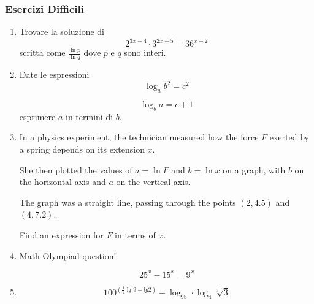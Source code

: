 \subsubsection{Esercizi Difficili}\label{subsec:eser_diff} %

\begin{enumerate} %
\item Trovare la soluzione di %
\begin{equation*}
2^{3x-4}\cdot3^{2x-5}=36^{x-2}
\end{equation*}
scritta come $\frac{\ln p}{\ln q}$ dove $p$ e $q$ sono interi.
\item Date le espressioni %
\begin{equation*}
\log_a b^2=c^2
\end{equation*}

\begin{equation*}
\log_b a = c+1
\end{equation*}
esprimere $a$ in termini di $b$.
\item  %
In a physics experiment, the technician measured how the force $F$ exerted by a spring depends on its extension $x$.

She then plotted the values of $a = \ln F$ and $b = \ln x$ on a graph, with $b$ on the horizontal axis and $a$ on the vertical axis.

The graph was a straight line, passing through the points $(2, 4.5)$ and $(4, 7.2)$.

Find an expression for $F$ in terms of $x$.

\item Math Olympiad question!  

\begin{equation*}
25^x-15^x=9^x
\end{equation*}


\item 

\begin{equation*}
100^{\left(\frac{1}{2}\lg9-lg2\right)}-\log_98\cdot\log_4\sqrt[3]{3}
\end{equation*}



\end{enumerate} %


